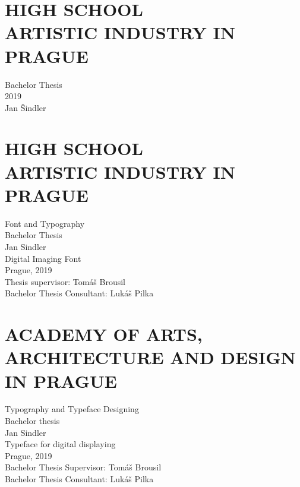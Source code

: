 \documentclass[a4paper]{article}
\begin{document}
\section*{HIGH SCHOOL \\ARTISTIC INDUSTRY IN PRAGUE}
\thispagestyle{empty}
Bachelor Thesis \\
\vfill
2019 \\
Jan Šindler

\section*{HIGH SCHOOL \\ARTISTIC INDUSTRY IN PRAGUE}
\thispagestyle{empty}
Font and Typography \\
Bachelor Thesis \\
Jan Sindler \\
\vspace{20mm}
Digital Imaging Font \\
\vfill
Prague, 2019 \\
Thesis supervisor: Tomáš Brousil \\
Bachelor Thesis Consultant: Lukáš Pilka \\

\section*{ACADEMY OF ARTS, \\
ARCHITECTURE AND DESIGN IN PRAGUE}
\thispagestyle{empty}
Typography and Typeface Designing \\
Bachelor thesis \\
Jan Sindler \\
\vspace{20mm}
Typeface for digital displaying \\
\vfill
Prague, 2019 \\
Bachelor Thesis Supervisor: Tomáš Brousil \\
Bachelor Thesis Consultant: Lukáš Pilka \\
\end{document}
